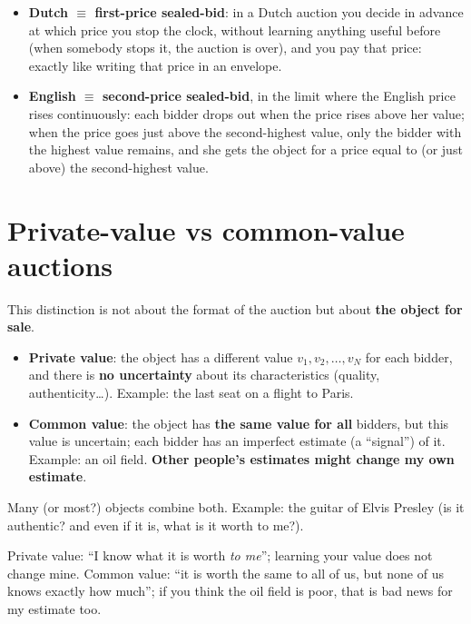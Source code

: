 \documentclass[11pt,a4paper,openany]{book}
\begin{document}
\begin{propbox}[title=Equivalences]
\begin{itemize}
  \item \textbf{Dutch $\equiv$ first-price sealed-bid}: in a Dutch auction you decide in
        advance at which price you stop the clock, without learning anything useful before
        (when somebody stops it, the auction is over), and you pay that price: exactly like
        writing that price in an envelope.
  \item \textbf{English $\equiv$ second-price sealed-bid}, in the limit where the English
        price rises continuously: each bidder drops out when the price rises above her
        value; when the price goes just above the second-highest value, only the bidder with
        the highest value remains, and she gets the object for a price equal to (or just
        above) the second-highest value.
\end{itemize}
\end{propbox}


\section{Private-value vs common-value auctions}

\begin{defnbox}[title=Private vs common value]
This distinction is not about the format of the auction but about \textbf{the object for
sale}.
\begin{itemize}
  \item \textbf{Private value}: the object has a different value $v_1, v_2, \ldots, v_N$ for
        each bidder, and there is \textbf{no uncertainty} about its characteristics
        (quality, authenticity\dots). Example: the last seat on a flight to Paris.
  \item \textbf{Common value}: the object has \textbf{the same value for all} bidders, but
        this value is uncertain; each bidder has an imperfect estimate (a ``signal'') of it.
        Example: an oil field. \textbf{Other people's estimates might change my own
        estimate}.
\end{itemize}
Many (or most?) objects combine both. Example: the guitar of Elvis Presley (is it authentic?
and even if it is, what is it worth to me?).
\end{defnbox}

\begin{rembox}[title=In plain words]
Private value: ``I know what it is worth \emph{to me}''; learning your value does not change
mine. Common value: ``it is worth the same to all of us, but none of us knows exactly how
much''; if you think the oil field is poor, that is bad news for my estimate too.
\end{rembox}
\end{document}
